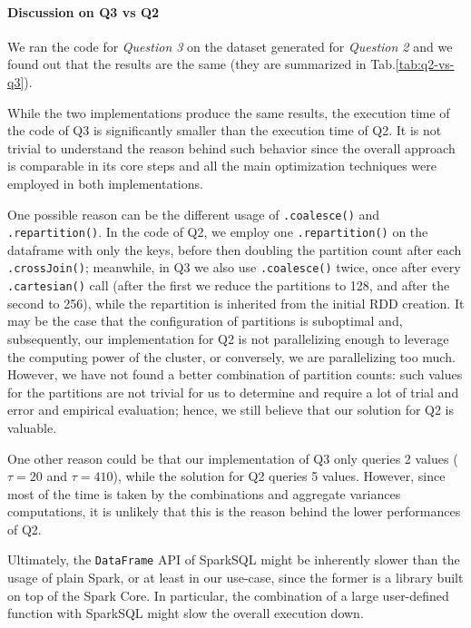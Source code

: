 \paragraph{\textbf{Discussion on Q3 vs Q2}}
\begin{figure}
  \centering
  
\end{figure}
We ran the code for \emph{Question 3} on the dataset generated for \emph{Question 2} and we found out that the results are the same (they are summarized in Tab.\ref{tab:q2-vs-q3}).

While the two implementations produce the same results, the execution time of the code of Q3 is significantly smaller than the execution time of Q2. It is not trivial to understand the reason behind such behavior since the overall approach is comparable in its core steps and all the main optimization techniques were employed in both implementations. 

One possible reason can be the different usage of \texttt{.coalesce()} and \texttt{.repartition()}. In the code of Q2, we employ one \texttt{.repartition()} on the dataframe with only the keys, before then doubling the partition count after each \texttt{.crossJoin()}; meanwhile, in Q3 we also use \texttt{.coalesce()} twice, once after every \texttt{.cartesian()} call (after the first we reduce the partitions to 128, and after the second to 256), while the repartition is inherited from the initial RDD creation. It may be the case that the configuration of partitions is suboptimal and, subsequently, our implementation for Q2 is not parallelizing enough to leverage the computing power of the cluster, or conversely, we are parallelizing too much. However, we have not found a better combination of partition counts: such values for the partitions are not trivial for us to determine and require a lot of trial and error and empirical evaluation; hence, we still believe that our solution for Q2 is valuable.

One other reason could be that our implementation of Q3 only queries 2 values (\(\tau = 20\) and \(\tau = 410\)), while the solution for Q2 queries 5 values. However, since most of the time is taken by the combinations and aggregate variances computations, it is unlikely that this is the reason behind the lower performances of Q2.

Ultimately, the \texttt{DataFrame} API of SparkSQL might be inherently slower than the usage of plain Spark, or at least in our use-case, since the former is a library built on top of the Spark Core. In particular, the combination of a large user-defined function with SparkSQL might slow the overall execution down.
